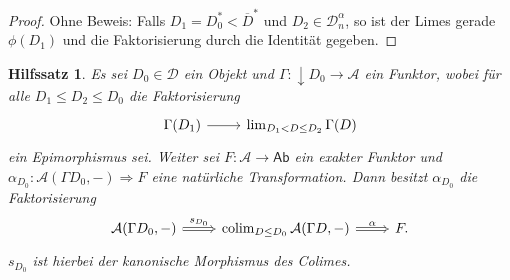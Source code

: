 \documentclass[a4paper, parskip=half,11pt]{scrartcl}
\theoremstyle{marginbreak}
\newtheorem{lemma}[remark]{Hilfssatz}
\theoremstyle{nonumberplain}
\newtheorem{proof}{Beweis.}
\newcommand\ccat\mathsf
\newcommand\cat\mathcal
\newcommand{\down}[1]{{\downarrow}#1}
\newcommand\nat\Rightarrow
\DeclareMathOperator{\colim}{colim}
\begin{document}
{\begin{proof}
			Ohne Beweis: Falls $D_1=D_0^*<\overline{D}^*$ und $D_2\in\cat{D}_n^\alpha$,
			so ist der Limes gerade $\phi(D_1)$ und die Faktorisierung durch die Identität gegeben.
		\end{proof}}
		\begin{lemma}\label{func}
			Es sei $D_0\in\cat{D}$ ein Objekt und $\Gamma\colon \down{D_0}\to\cat{A}$
			ein Funktor, wobei für alle $D_1\leq D_2\leq D_0$ die Faktorisierung
			\[
				\begin{tikzcd}
					\Gamma(D_1) \arrow[r] & \lim_{D_1<D\leq D_2} \Gamma(D)
				\end{tikzcd}
			\]
			ein Epimorphismus sei. Weiter sei $F\colon\cat{A}\to\ccat{Ab}$ ein exakter
			Funktor und $\alpha_{D_0}\colon \cat{A}(\Gamma D_0, {-})\nat F$
			eine natürliche Transformation. Dann besitzt $\alpha_{D_0}$ die
			Faktorisierung
			\[
				\begin{tikzcd}
					\cat{A}(\Gamma D_0, {-}) \arrow[Rightarrow]{r}{s_{D_0}} & \colim_{D\leq D_0}\cat{A}(\Gamma D, {-}) \arrow[Rightarrow]{r}{\alpha} & F.
				\end{tikzcd}
			\]
			$s_{D_0}$ ist hierbei der kanonische Morphismus des Colimes.
		\end{lemma}
\end{document}
